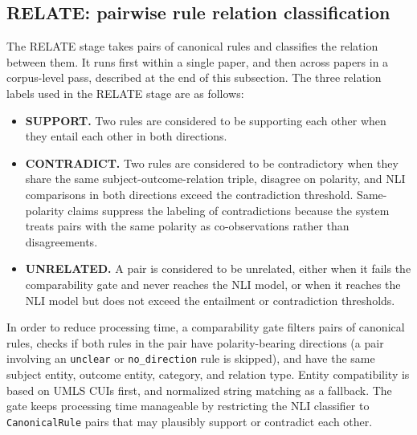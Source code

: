 \subsection{RELATE: pairwise rule relation classification}\label{subsec:knowledge-relate}

The RELATE stage takes pairs of canonical rules and classifies the relation between them. It runs first within a single paper, and then across papers in a corpus-level pass, described at the end of this subsection. The three relation labels used in the RELATE stage are as follows: 

\begin{itemize}[label={}, leftmargin=1.5em, itemsep=0.4em]

    \item \textbf{SUPPORT.} Two rules are considered to be supporting each other when they entail each other in both directions.
    
    \item \textbf{CONTRADICT.} Two rules are considered to be contradictory when they share the same subject-outcome-relation triple, disagree on polarity, and NLI comparisons in both directions exceed the contradiction threshold. Same-polarity claims suppress the labeling of contradictions because the system treats pairs with the same polarity as co-observations rather than disagreements. 
    
    \item \textbf{UNRELATED.} A pair is considered to be unrelated, either when it fails the comparability gate and never reaches the NLI model, or when it reaches the NLI model but does not exceed the entailment or contradiction thresholds.
    
\end{itemize}

In order to reduce processing time, a comparability gate filters pairs of canonical rules, checks if both rules in the pair have polarity-bearing directions (a pair involving an \texttt{unclear} or \texttt{no\_direction} rule is skipped), and have the same subject entity, outcome entity, category, and relation type. Entity compatibility is based on UMLS CUIs first, and normalized string matching as a fallback. The gate keeps processing time manageable by restricting the NLI classifier to \texttt{CanonicalRule} pairs that may plausibly support or contradict each other.

